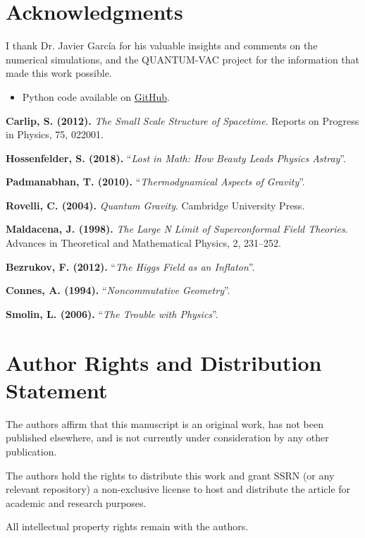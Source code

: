 \documentclass[a4paper]{article}
\theoremstyle{definition}
\theoremstyle{remark}
\numberwithin{equation}{section}
\begin{document}
\section*{Acknowledgments}

I thank Dr. Javier García for his valuable insights and comments on the numerical simulations, and the QUANTUM-VAC project for the information that made this work possible.

\begin{itemize}
	\item Python code available on \href{https://github.com/KerymMacryn/VA-Theory}{GitHub}.
\end{itemize}

	
	\begin{thebibliography}{9}
		\textbf{Carlip, S. (2012).} \textit{The Small Scale Structure of Spacetime}. Reports on Progress in Physics, 75, 022001.
		
		 \textbf{Hossenfelder, S. (2018).} ``\textit{Lost in Math: How Beauty Leads Physics Astray}''. 		
		
		 \textbf{Padmanabhan, T. (2010).} ``\textit{Thermodynamical Aspects of Gravity}''.
		
		 \textbf{Rovelli, C. (2004).} \textit{Quantum Gravity}. Cambridge University Press.
		
		 \textbf{Maldacena, J. (1998).} \textit{The Large N Limit of Superconformal Field Theories}. Advances in Theoretical and Mathematical Physics, 2, 231–252.
		
		 \textbf{Bezrukov, F. (2012).} ``\textit{The Higgs Field as an Inflaton}''. 
		
		 \textbf{Connes, A. (1994).} ``\textit{Noncommutative Geometry}''.
		
		 \textbf{Smolin, L. (2006).} ``\textit{The Trouble with Physics}''.
		
	\end{thebibliography}
	
	
\section*{Author Rights and Distribution Statement}
The authors affirm that this manuscript is an original work, has not been published elsewhere, and is not currently under consideration by any other publication. 

The authors hold the rights to distribute this work and grant SSRN (or any relevant repository) a non-exclusive license to host and distribute the article for academic and research purposes.

All intellectual property rights remain with the authors.
	
	
\end{document}
